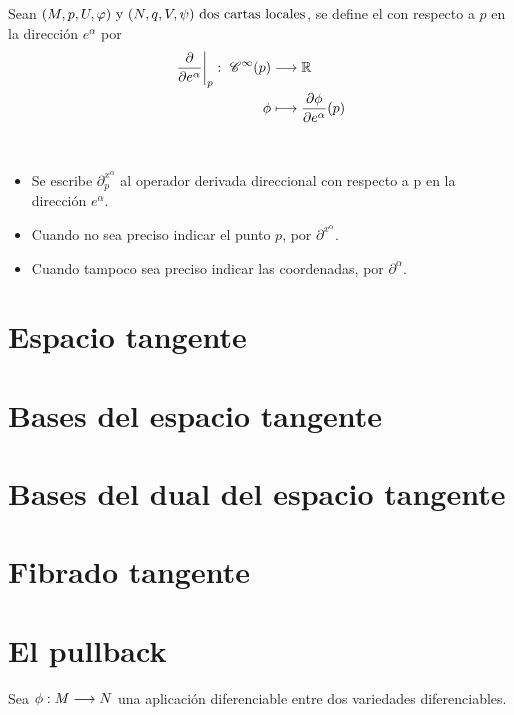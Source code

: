 \begin{definition}
  Sean $(M,p,U,\varphi)\textmd{ y } (N,q,V,\psi)\textmd{ dos cartas locales}$, se define el
   con
  respecto a $p$ en la dirección $e^\alpha$ por
  \begin{equation}
    \begin{alignedat}{1}
      \label{eq:operador-parcial-funcion-punto}
      \left.\frac{\partial}{\partial e^\alpha}\right|_p:\ \mathscr{C}^\infty(p) & \longrightarrow \mathbb{R} \\ \phi & \longmapsto \frac{\partial
      \phi}{\partial e^\alpha}(p)
    \end{alignedat}
  \end{equation}
\end{definition}
\begin{notation}
  \
  \begin{itemize}
    \item Se escribe $\partial^{x^\alpha}_p$ al operador derivada direccional con respecto a p en la dirección
    $e^\alpha$.
    \item Cuando no sea preciso indicar el punto $p$, por $\partial^{x^\alpha}$.
    \item Cuando tampoco sea preciso indicar las coordenadas, por $\partial^\alpha$.
  \end{itemize}
\end{notation}


\section{Espacio tangente}\label{sec:espacio-tangente}



\section{Bases del espacio tangente}\label{sec:bases-espacio-tangente}


\section{Bases del dual del espacio tangente}\label{sec:bases-dual-espacio-tangente}



\section{Fibrado tangente}\label{sec:fibrado-tangente}


\section{El pullback}\label{sec:pullback}
Sea $\phi:M\longrightarrow N$ una aplicación diferenciable entre dos variedades diferenciables.

